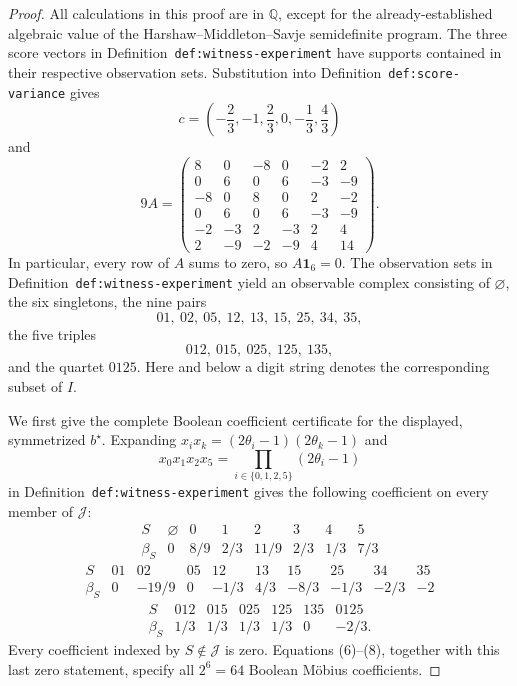 \documentclass{article}
\begin{document}
\begin{proof}
All calculations in this proof are in \(\mathbb Q\), except for the already-established algebraic value of the Harshaw--Middleton--Savje semidefinite program.  The three score vectors in Definition~\texttt{def:witness-experiment} have supports contained in their respective observation sets.  Substitution into Definition~\texttt{def:score-variance} gives
\[
c=\left(-\frac23,-1,\frac23,0,-\frac13,\frac43\right)
\tag{1}
\]
and
\[
9A=
\begin{pmatrix}
8&0&-8&0&-2&2\\
0&6&0&6&-3&-9\\
-8&0&8&0&2&-2\\
0&6&0&6&-3&-9\\
-2&-3&2&-3&2&4\\
2&-9&-2&-9&4&14
\end{pmatrix}.
\tag{2}
\]
In particular, every row of \(A\) sums to zero, so \(A\mathbf 1_6=0\).  The observation sets in Definition~\texttt{def:witness-experiment} yield an observable complex consisting of \(\varnothing\), the six singletons, the nine pairs
\[
01,\ 02,\ 05,\ 12,\ 13,\ 15,\ 25,\ 34,\ 35,
\tag{3}
\]
the five triples
\[
012,\ 015,\ 025,\ 125,\ 135,
\tag{4}
\]
and the quartet \(0125\).  Here and below a digit string denotes the corresponding subset of \(I\).

We first give the complete Boolean coefficient certificate for the displayed, symmetrized \(b^\star\).  Expanding \(x_i x_k=(2\theta_i-1)(2\theta_k-1)\) and
\[
x_0x_1x_2x_5=
\prod_{i\in\{0,1,2,5\}}(2\theta_i-1)
\tag{5}
\]
in Definition~\texttt{def:witness-experiment} gives the following coefficient on every member of \(\mathcal J\):
\[
\begin{array}{c|rrrrrrr}
S&\varnothing&0&1&2&3&4&5\\ \hline
\beta_S&0&8/9&2/3&11/9&2/3&1/3&7/3
\end{array}
\tag{6}
\]
\[
\begin{array}{c|rrrrrrrrr}
S&01&02&05&12&13&15&25&34&35\\ \hline
\beta_S&0&-19/9&0&-1/3&4/3&-8/3&-1/3&-2/3&-2
\end{array}
\tag{7}
\]
\[
\begin{array}{c|rrrrrr}
S&012&015&025&125&135&0125\\ \hline
\beta_S&1/3&1/3&1/3&1/3&0&-2/3.
\end{array}
\tag{8}
\]
Every coefficient indexed by \(S\notin\mathcal J\) is zero.  Equations (6)--(8), together with this last zero statement, specify all \(2^6=64\) Boolean Möbius coefficients.


\end{proof}
\end{document}
